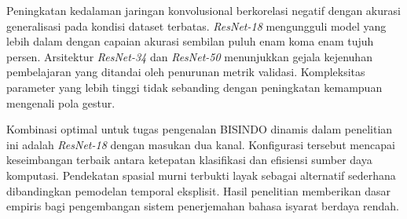 Peningkatan kedalaman jaringan konvolusional berkorelasi negatif dengan akurasi generalisasi pada kondisi dataset terbatas.
\textit{ResNet-18} mengungguli model yang lebih dalam dengan capaian akurasi sembilan puluh enam koma enam tujuh persen.
Arsitektur \textit{ResNet-34} dan \textit{ResNet-50} menunjukkan gejala kejenuhan pembelajaran yang ditandai oleh penurunan metrik validasi.
Kompleksitas parameter yang lebih tinggi tidak sebanding dengan peningkatan kemampuan mengenali pola gestur.

Kombinasi optimal untuk tugas pengenalan BISINDO dinamis dalam penelitian ini adalah \textit{ResNet-18} dengan masukan dua kanal.
Konfigurasi tersebut mencapai keseimbangan terbaik antara ketepatan klasifikasi dan efisiensi sumber daya komputasi.
Pendekatan spasial murni terbukti layak sebagai alternatif sederhana dibandingkan pemodelan temporal eksplisit.
Hasil penelitian memberikan dasar empiris bagi pengembangan sistem penerjemahan bahasa isyarat berdaya rendah.

